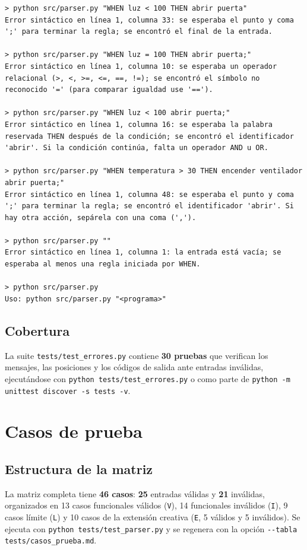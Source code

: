 \documentclass[12pt,a4paper]{article}
\begin{document}
\begin{lstlisting}
> python src/parser.py "WHEN luz < 100 THEN abrir puerta"
Error sintáctico en línea 1, columna 33: se esperaba el punto y coma ';' para terminar la regla; se encontró el final de la entrada.

> python src/parser.py "WHEN luz = 100 THEN abrir puerta;"
Error sintáctico en línea 1, columna 10: se esperaba un operador relacional (>, <, >=, <=, ==, !=); se encontró el símbolo no reconocido '=' (para comparar igualdad use '==').

> python src/parser.py "WHEN luz < 100 abrir puerta;"
Error sintáctico en línea 1, columna 16: se esperaba la palabra reservada THEN después de la condición; se encontró el identificador 'abrir'. Si la condición continúa, falta un operador AND u OR.

> python src/parser.py "WHEN temperatura > 30 THEN encender ventilador abrir puerta;"
Error sintáctico en línea 1, columna 48: se esperaba el punto y coma ';' para terminar la regla; se encontró el identificador 'abrir'. Si hay otra acción, sepárela con una coma (',').

> python src/parser.py ""
Error sintáctico en línea 1, columna 1: la entrada está vacía; se esperaba al menos una regla iniciada por WHEN.

> python src/parser.py
Uso: python src/parser.py "<programa>"
\end{lstlisting}

\subsection{Cobertura}
La suite \texttt{tests/test\_errores.py} contiene \textbf{30 pruebas} que
verifican los mensajes, las posiciones y los códigos de salida ante entradas
inválidas, ejecutándose con \texttt{python tests/test\_errores.py} o como
parte de \texttt{python -m unittest discover -s tests -v}.

\section{Casos de prueba}

\subsection{Estructura de la matriz}
La matriz completa tiene \textbf{46 casos}: \textbf{25} entradas válidas y
\textbf{21} inválidas, organizados en 13 casos funcionales válidos (\texttt{V}),
14 funcionales inválidos (\texttt{I}), 9 casos límite (\texttt{L}) y 10 casos
de la extensión creativa (\texttt{E}, 5 válidos y 5 inválidos). Se ejecuta con
\texttt{python tests/test\_parser.py} y se regenera con la opción
\texttt{-{}-tabla tests/casos\_prueba.md}.
\end{document}
